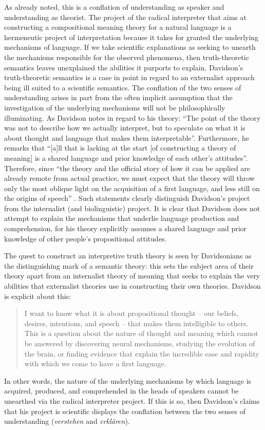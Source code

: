 As already noted, this is a conflation of understanding as speaker and understanding as theorist. The project of the radical interpreter that aims at constructing a compositional meaning theory for a natural language is a hermeneutic project of interpretation because it takes for granted the underlying mechanisms of language. If we take scientific explanations as seeking to unearth the mechanisms responsible for the observed phenomena, then truth-theoretic semantics leaves unexplained the abilities it purports to explain. Davidson’s truth-theoretic semantics is a case in point in regard to an externalist approach being ill suited to a scientific semantics. The conflation of the two senses of understanding arises in part from the often implicit assumption that the investigation of the underlying mechanisms will not be philosophically illuminating. As Davidson notes in regard to his theory: “The point of the theory was not to describe how we actually interpret, but to speculate on what it is about thought and language that makes them interpretable”. Furthermore, he remarks that “[a]ll that is lacking at the start [of constructing a theory of meaning] is a shared language and prior knowledge of each other’s attitudes”. Therefore, since “the theory and the official story of how it can be applied are already remote from actual practice, we must expect that the theory will throw only the most oblique light on the acquisition of a first language, and less still on the origins of speech” \citep[128]{Davidson1995}. Such statements clearly distinguish Davidson’s project from the internalist (and biolinguistic) project. It is clear that Davidson does not attempt to explain the mechanisms that underlie language production and comprehension, for his theory explicitly assumes a shared language and prior knowledge of other people’s propositional attitudes. 

The quest to construct an interpretive truth theory is seen by Davidsonians as the distinguishing mark of a semantic theory: this sets the subject area of their theory apart from an internalist theory of meaning that seeks to explain the very abilities that externalist theories use in constructing their own theories. Davidson is explicit about this:
\begin{quote}
I want to know what it is about propositional thought – our beliefs, desires, intentions, and speech – that makes them intelligible to others. This is a question about the nature of thought and meaning which cannot be answered by discovering neural mechanisms, studying the evolution of the brain, or finding evidence that explain the incredible ease and rapidity with which we come to have a first language. \citep[133]{Davidson1995}
\end{quote}
In other words, the nature of the underlying mechanisms by which language is acquired, produced, and comprehended in the heads of speakers cannot be unearthed via the radical interpreter project. If this is so, then Davidson’s claims that his project is scientific displays the conflation between the two senses of understanding (\textit{verstehen} and \textit{erklären}).

